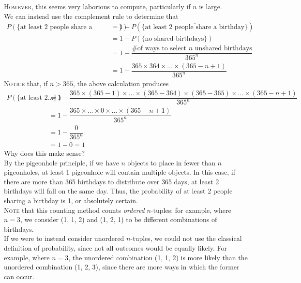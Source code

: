 \documentclass{article}
\begin{document}
\textsc{However}, this seems very laborious to compute, particularly if $n$ is large.\\
We can instead use the complement rule to determine that
\begin{align*}
P(\{\text{at least 2 people share a birthday}\})& =1-P(\{\overline{\text{at least 2 people share a birthday}}\})\\
& =1-P(\{\text{no shared birthdays}\})\\
& =1-\dfrac{\text{\# of ways to select $n$ unshared birthdays}}{365^n}\\
& =1-\dfrac{365\times 364\times\ldots\times(365-n+1)}{365^n}
\end{align*}
\textsc{Notice} that, if $n>365$, the above calculation produces
\begin{align*}
P(\{\text{at least 2\ldots}\})& =1-\dfrac{365\times(365-1)\times\ldots\times(365-364)\times(365-365)\times\ldots\times(365-n+1)}{365^n}\\
& =1-\dfrac{365\times\ldots\times 0\times\ldots\times(365-n+1)}{365^n}\\
& =1-\dfrac{0}{365^n}\\
& =1-0=1
\end{align*}
Why does this make sense?\\[1ex]
By the pigeonhole principle, if we have $n$ objects to place in fewer than $n$ pigeonholes, at least 1 pigeonhole will contain multiple objects. In this case, if there are more than 365 birthdays to distribute over 365 days, at least 2 birthdays will fall on the same day. Thus, the probability of at least 2 people sharing a birthday is 1, or absolutely certain.\\[1ex]
\textsc{Note} that this counting method counts \textit{ordered} $n$-tuples: for example, where $n=3$, we consider (1, 1, 2) and (1, 2, 1) to be different combinations of birthdays.\\
If we were to instead consider unordered $n$-tuples, we could not use the classical definition of probability, since not all outcomes would be equally likely. For example, where $n=3$, the unordered combination (1, 1, 2) is more likely than the unordered combination (1, 2, 3), since there are more ways in which the former can occur.
\end{document}
